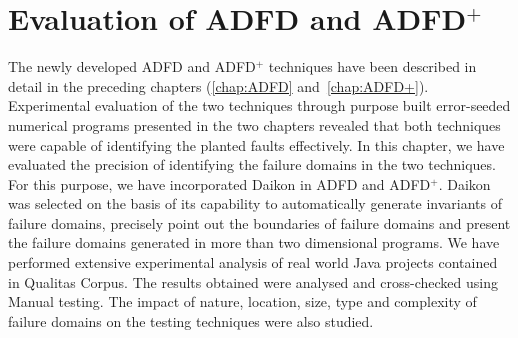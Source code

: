 
\chapter{Evaluation of ADFD and ADFD$^+$}
\label{chap:Evaluation}
	
The newly developed ADFD and ADFD$^+$ techniques have been described in detail in the preceding chapters (\ref{chap:ADFD} and~\ref{chap:ADFD+}). Experimental evaluation of the two techniques through purpose built error-seeded numerical programs presented in the two chapters revealed that both techniques were capable of identifying the planted faults effectively. In this chapter, we have evaluated the precision of identifying the failure domains in the two techniques. For this purpose, we have incorporated Daikon in ADFD and ADFD$^+$. Daikon was selected on the basis of its capability to automatically generate invariants of failure domains, precisely point out the boundaries of failure domains and present the failure domains generated in more than two dimensional programs. We have performed extensive experimental analysis of real world Java projects contained in Qualitas Corpus. The results obtained were analysed and cross-checked using Manual testing. The impact of nature, location, size, type and complexity of failure domains on the testing techniques were also studied. 




  





